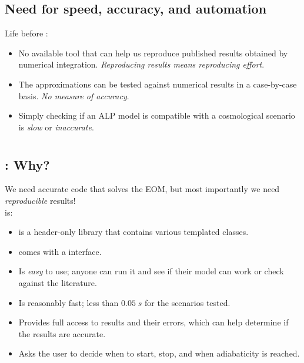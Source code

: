 \documentclass[10pt,utf8,compress,xcolor=dvipsnames]{beamer}
\begin{document}
\subsection{Need for speed, accuracy, and automation}
\begin{frame}{\insertsubsectionhead}
	Life before \mimes: \\[1cm]\pause
	\begin{itemize}
		\item No available tool that can help us reproduce published results obtained by numerical integration. \emph{Reproducing results means reproducing effort}.\pause
		\item The approximations can be tested against numerical results in a case-by-case basis. \emph{No measure of accuracy}.\pause%
		\item Simply checking if an ALP model is compatible with a cosmological scenario is \emph{slow} or \emph{inaccurate}. 
	\end{itemize}
	
	
	
\end{frame}




\section{\mimes}
\subsection{\mimes: Why?}
\begin{frame}{\insertsubsectionhead}
	We need accurate code that solves the EOM, but most importantly we need {\sl reproducible} results! \\[0.2cm]
	
	\mimes is:
	\begin{itemize}
		\item \mimes is a \CPP header-only library that contains various templated classes. 
%		
		\item \mimes comes with a \PY interface.
%
		\item Is {\sl easy} to use; anyone can run it and see if their model can work or check against the literature.
%
		\item Is reasonably fast; less than $0.05 \; s$ for the scenarios tested.
%
		\item Provides full access to results and their errors, which can help determine if the results are accurate.
%
		\item Asks the user to decide when to start, stop, and when adiabaticity is reached.
	\end{itemize}
	
\end{frame}
\end{document}
